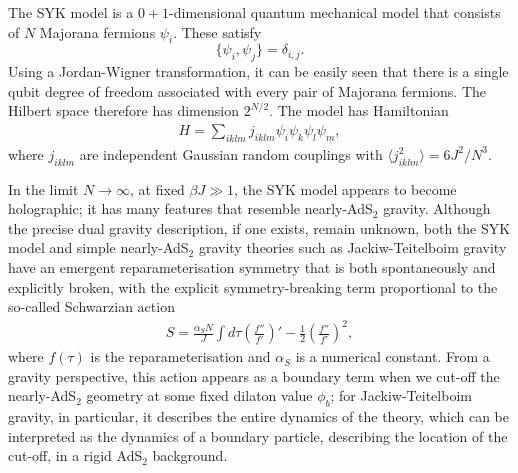 \documentclass[11pt,a4paper]{article}
\begin{document}
The SYK model is a $0+1$-dimensional quantum mechanical model that consists of $N$ Majorana fermions $\psi_i$. These satisfy $$\{\psi_i, \psi_j\} = \delta_{i,j}.$$ Using a Jordan-Wigner transformation, it can be easily seen that there is a single qubit degree of freedom associated with every pair of Majorana fermions. The Hilbert space therefore has dimension $2^{N/2}$. The model has Hamiltonian
\begin{align}
H = \sum_{iklm} j_{iklm} \psi_i \psi_k \psi_l \psi_m,
\end{align}
where $j_{iklm}$ are independent Gaussian random couplings with $\langle j_{iklm}^2\rangle = 6 J^2/N^3$. 

In the limit $N \to \infty$, at fixed $\beta J \gg 1$, the SYK model appears to become holographic; it has many features that resemble nearly-AdS$_2$ gravity. Although the precise dual gravity description, if one exists, remain unknown, both the SYK model and simple nearly-AdS$_2$ gravity theories such as Jackiw-Teitelboim gravity \cite{almheiri2015models, engelsoy2016investigation, jensen2016chaos, maldacena2016conformal, saad2019jt} have an emergent reparameterisation symmetry that is both spontaneously and explicitly broken, with the explicit symmetry-breaking term proportional to the so-called Schwarzian action
\begin{align} \label{eq:schwarz}
S = \frac{\alpha_S N}{J} \int d\tau \left(\frac{f''}{f'}\right)' - \frac{1}{2} \left(\frac{f''}{f'}\right)^2,
\end{align}
where $f(\tau)$ is the reparameterisation and $\alpha_S$ is a numerical constant. From a gravity perspective, this action appears as a boundary term when we cut-off the nearly-AdS$_2$ geometry at some fixed dilaton value $\phi_b$; for Jackiw-Teitelboim gravity, in particular, it describes the entire dynamics of the theory, which can be interpreted as the dynamics of a boundary particle, describing the location of the cut-off, in a rigid AdS$_2$ background.
\end{document}
